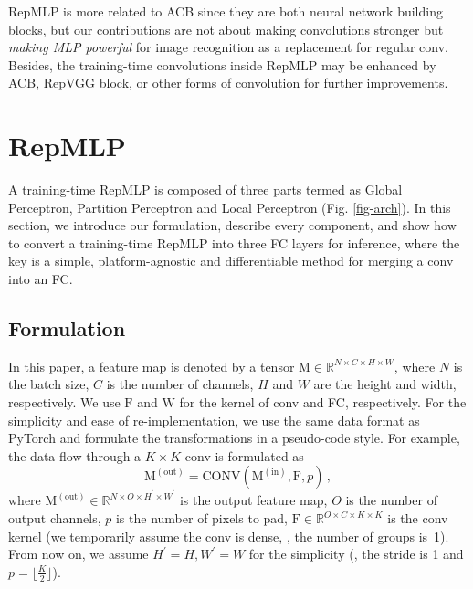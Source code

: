 \documentclass[10pt,twocolumn,letterpaper]{article}
\begin{document}
RepMLP is more related to ACB since they are both neural network building blocks, but our contributions are not about making convolutions stronger but \textit{making MLP powerful} for image recognition as a replacement for regular conv. Besides, the training-time convolutions inside RepMLP may be enhanced by ACB, RepVGG block, or other forms of convolution for further improvements.




















\section{RepMLP}






A training-time RepMLP is composed of three parts termed as Global Perceptron, Partition Perceptron and Local Perceptron (Fig. \ref{fig-arch}). In this section, we introduce our formulation, describe every component, and show how to convert a training-time RepMLP into three FC layers for inference, where the key is a simple, platform-agnostic and differentiable method for merging a conv into an FC.

\subsection{Formulation}

In this paper, a feature map is denoted by a tensor $\mathrm{M}\in\mathbb{R}^{N\times C\times H\times W}$, where $N$ is the batch size, $C$ is the number of channels, $H$ and $W$ are the height and width, respectively. We use $\mathrm{F}$ and $\mathrm{W}$ for the kernel of conv and FC, respectively. For the simplicity and ease of re-implementation, we use the same data format as PyTorch \cite{paszke2019pytorch} and formulate the transformations in a pseudo-code style. For example, the data flow through a $K\times K$ conv is formulated as
\begin{equation}
	\mathrm{M}^{(\text{out})} = \text{CONV}(\mathrm{M}^{(\text{in})}, \mathrm{F}, p) \,,
\end{equation}
where $\mathrm{M}^{(\text{out})}\in\mathbb{R}^{N\times O\times H^\prime\times W^\prime}$ is the output feature map, $O$ is the number of output channels, $p$ is the number of pixels to pad, $\mathrm{F}\in\mathbb{R}^{O\times C\times K\times K}$ is the conv kernel (we temporarily assume the conv is dense, \ie, the number of groups is~1). From now on, we assume $H^\prime=H, W^\prime=W$ for the simplicity (\ie, the stride is 1 and $p=\lfloor \frac{K}{2} \rfloor$).
\end{document}
